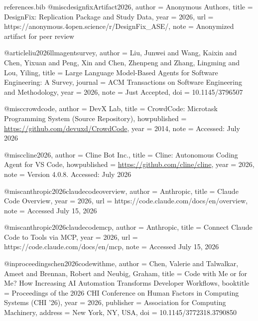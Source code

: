 
\begin{filecontents*}[overwrite]{references.bib}
@misc{designfixArtifact2026,
  author = {{Anonymous Authors}},
  title  = {{DesignFix}: Replication Package and Study Data},
  year   = {2026},
  url    = {https://anonymous.4open.science/r/DesignFix_ASE/},
  note   = {Anonymized artifact for peer review}
}


@article{liu2026llmagentsurvey,
  author  = {Liu, Junwei and Wang, Kaixin and Chen, Yixuan and Peng, Xin and
             Chen, Zhenpeng and Zhang, Lingming and Lou, Yiling},
  title   = {Large Language Model-Based Agents for Software Engineering: A Survey},
  journal = {ACM Transactions on Software Engineering and Methodology},
  year    = {2026},
  note    = {Just Accepted},
  doi     = {10.1145/3796507}
}

@misc{crowdcode,
  author       = {{DevX Lab}},
  title        = {{CrowdCode}: Microtask Programming System (Source Repository)},
  howpublished = {\url{https://github.com/devuxd/CrowdCode}},
  year         = {2014},
  note         = {Accessed: July 2026}
}

@misc{cline2026,
  author       = {{Cline Bot Inc.}},
  title        = {Cline: Autonomous Coding Agent for {VS Code}},
  howpublished = {\url{https://github.com/cline/cline}},
  year         = {2026},
  note         = {Version 4.0.8. Accessed: July 2026}
}



@misc{anthropic2026claudecodeoverview,
  author = {{Anthropic}},
  title  = {{Claude Code} Overview},
  year   = {2026},
  url    = {https://code.claude.com/docs/en/overview},
  note   = {Accessed July 15, 2026}
}

@misc{anthropic2026claudecodemcp,
  author = {{Anthropic}},
  title  = {Connect {Claude Code} to Tools via {MCP}},
  year   = {2026},
  url    = {https://code.claude.com/docs/en/mcp},
  note   = {Accessed July 15, 2026}
}

@inproceedings{chen2026codewithme,
  author    = {Chen, Valerie and Talwalkar, Ameet and Brennan, Robert and Neubig, Graham},
  title     = {Code with Me or for Me? How Increasing {AI} Automation Transforms
               Developer Workflows},
  booktitle = {Proceedings of the 2026 CHI Conference on Human Factors in
               Computing Systems (CHI '26)},
  year      = {2026},
  publisher = {Association for Computing Machinery},
  address   = {New York, NY, USA},
  doi       = {10.1145/3772318.3790850}
}


\end{filecontents*}

